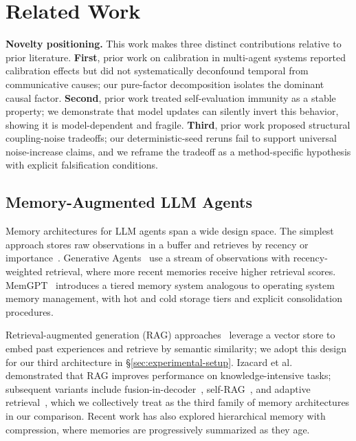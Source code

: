 \documentclass[11pt]{article}
\begin{document}
\section{Related Work}
\textbf{Novelty positioning.} This work makes three distinct contributions relative to prior literature. \textbf{First}, prior work on calibration in multi-agent systems reported calibration effects but did not systematically deconfound temporal from communicative causes; our pure-factor decomposition isolates the dominant causal factor. \textbf{Second}, prior work treated self-evaluation immunity as a stable property; we demonstrate that model updates can silently invert this behavior, showing it is model-dependent and fragile. \textbf{Third}, prior work proposed structural coupling-noise tradeoffs; our deterministic-seed reruns fail to support universal noise-increase claims, and we reframe the tradeoff as a method-specific hypothesis with explicit falsification conditions.



\subsection{Memory-Augmented LLM Agents}

Memory architectures for LLM agents span a wide design space. The simplest approach stores raw observations in a buffer and retrieves by recency or importance~\cite{park2023generative}. Generative Agents~\cite{park2023generative} use a stream of observations with recency-weighted retrieval, where more recent memories receive higher retrieval scores. MemGPT~\cite{packer2023memgpt} introduces a tiered memory system analogous to operating system memory management, with hot and cold storage tiers and explicit consolidation procedures.

Retrieval-augmented generation (RAG) approaches~\cite{lewis2020rag} leverage a vector store to embed past experiences and retrieve by semantic similarity; we adopt this design for our third architecture in \S\ref{sec:experimental-setup}. Izacard et al.~\cite{izacard2022fusion} demonstrated that RAG improves performance on knowledge-intensive tasks; subsequent variants include fusion-in-decoder~\cite{izacard2022fusion}, self-RAG~\cite{asai2023selfrag}, and adaptive retrieval~\cite{jiang2023active}, which we collectively treat as the third family of memory architectures in our comparison. Recent work has also explored hierarchical memory with compression, where memories are progressively summarized as they age.
\end{document}
